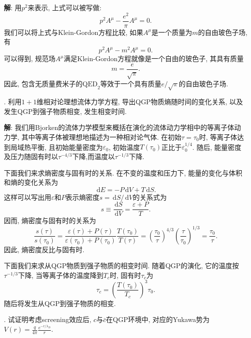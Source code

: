 \documentclass{ctexart}
\newcounter{mycnt}
\newenvironment{problem}{\noindent \stepcounter{mycnt}\themycnt.}{

}
\newenvironment{answer}{\textbf{解}:}{
\vspace{0.5cm}
}
\newcommand\diff{\,\mathrm{d}}
\begin{document}
\begin{answer}
用$p^2$来表示, 上式可以被写做:
\begin{equation}
  p^2 A^\mu - \frac{e^2}{\pi} A^\mu = 0.
\end{equation}
我们可以将上式与Klein-Gordon方程比较, 如果$A^\mu$是一个质量为$m$的自由玻色子场, 有
\begin{equation}
  p^2A^\mu - m^2 A^\mu = 0.
\end{equation}
可以得到, 规范场$A^\mu$满足Klein-Gordon方程就像是一个自由的玻色子, 其具有质量
\begin{equation}
  m = \frac{e}{\sqrt{\pi}}.
\end{equation}
因此, 包含无质量费米子的$\mathrm{QED}_2$等效于一个具有质量$e/\sqrt{\pi}$的自由玻色子场.


\end{answer}

\begin{problem}
  利用$1+1$维相对论理想流体力学方程, 导出QGP物质熵随时间的变化关系, 以及发生QGP到强子物质相变, 发生相变时间.
\end{problem}

\begin{answer}
  我们用Bjorken的流体力学模型来概括在演化的流体动力学相中的等离子体动力学, 其中等离子体被理想地描述为一种相对论气体. 在初始$\tau = \tau_0$时, 等离子体达到局域热平衡, 且初始能量密度为$\varepsilon_0$, 初始温度$T(\tau_0)$正比于$\varepsilon_0^{1/4}$. 随后, 能量密度及压力随固有时以$\tau^{-4/3}$下降,而温度以$\tau^{-1/3}$下降. 

下面我们来求熵密度与固有时的关系. 在不变的温度和压力下, 能量的变化与体积和熵的变化关系为
\begin{equation}
  \diff E = -P \diff V + T \diff S.
\end{equation}
这样可以写出用$\varepsilon$和$P$表示熵密度$s = \diff S / \diff V$的关系式为
\begin{equation}
  s \equiv \frac{\diff S}{\diff V} = \frac{\varepsilon + P}{T}.
\end{equation}
因而, 熵密度与固有时的关系为
\begin{equation}
  \frac{s(\tau)}{s(\tau_0)} = \frac{\varepsilon(\tau) + P(\tau)}{\varepsilon(\tau_0) + P(\tau_0)} \frac{T(\tau_0)}{T(\tau)} = \left( \frac{\tau_0}{\tau} \right)^{4/3} \left( \frac{\tau}{\tau_0} \right)^{1/3} = \frac{\tau_0}{\tau}.
\end{equation}
因此, 熵密度反比与固有时.

下面我们来求从QGP物质到强子物质的相变时间. 随着QGP的演化, 它的温度按$\tau^{-1/3}$下降, 当等离子体的温度降到$T_c$时, 固有时$\tau_c$为
\begin{equation}
  \tau_c = \left( \frac{T(\tau_0)}{T_c} \right)^3 \tau_0.
\end{equation}
随后将发生从QGP到强子物质的相变.

\end{answer}

\begin{problem}
  试证明考虑screening效应后, $c$与$\bar{c}$在QGP环境中, 对应的Yukawa势为$V(r) = \frac{q}{4\pi} \frac{e^{-r/\lambda_D}}{r}$.
\end{problem}
\end{document}
